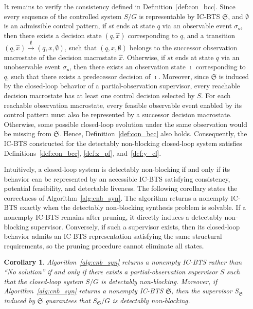 \documentclass[twocolumn]{autart}
\newtheorem{mycol}{\bf Corollary}
\begin{document}
\begin{pf}
It remains to verify the consistency defined in Definition~\ref{def:con_bcc}.
Since every sequence of the controlled system $S / G$ is representable by IC-BTS $\mathfrak{S}$, and $\emptyset$ is an admissible control pattern, if $st$ ends at state $q$ via an observable event $\sigma_o$, then there exists a decision state $(q, \hat{x})$ corresponding to $q$, and a transition $(q, \hat{x}) \xrightarrow{\emptyset} (q, x, \emptyset)$, such that $(q, x, \emptyset)$ belongs to the successor observation macrostate of the decision macrostate $\hat{x}$.
Otherwise, if $st$ ends at state $q$ via an unobservable event $\sigma_u$, then there exists an observation state $\imath$ corresponding to $q$, such that there exists a predecessor decision of $\imath$.
%
Moreover, since ${\mathfrak{S}}$ is induced by the closed-loop behavior of a partial-observation supervisor, every reachable decision macrostate has at least one control decision selected by $S$.
For each reachable observation macrostate, every feasible observable event enabled by its control pattern must also be represented by a successor decision macrostate.
Otherwise, some possible closed-loop evolution under the same observation would be missing from $\mathfrak{S}$.
Hence, Definition~\ref{def:con_bcc} also holds.
%
Consequently, the IC-BTS constructed for the detectably non-blocking closed-loop system satisfies Definitions~\ref{def:con_bcc}, \ref{def:z_pf}, and~\ref{def:y_cl}.
\end{pf}

Intuitively, a closed-loop system is detectably non-blocking if and only if its behavior can be represented by an accessible IC-BTS satisfying consistency, potential feasibility, and detectable liveness.
%
The following corollary states the correctness of Algorithm~\ref{alg:cnb_syn}.
The algorithm returns a nonempty IC-BTS exactly when the detectably non-blocking synthesis problem is solvable.
If a nonempty IC-BTS remains after pruning, it directly induces a detectably non-blocking supervisor.
Conversely, if such a supervisor exists, then its closed-loop behavior admits an IC-BTS representation satisfying the same structural requirements, so the pruning procedure cannot eliminate all states.

\begin{mycol}\label{cor:alg_cnb_sound}
Algorithm~\ref{alg:cnb_syn} returns a nonempty IC-BTS rather than ``No solution'' if and only if there exists a partial-observation supervisor $S$ such that the closed-loop system $S/G$ is detectably non-blocking.
%
Moreover, if Algorithm~\ref{alg:cnb_syn} returns a nonempty IC-BTS $\mathfrak{S}$, then the supervisor $S_{\mathfrak{S}}$ induced by $\mathfrak{S}$ guarantees that $S_{\mathfrak{S}}/G$ is detectably non-blocking.
\end{mycol}
\end{document}
